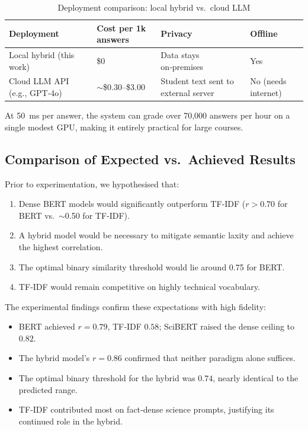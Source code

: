 \documentclass[11pt,a4paper]{article}
\begin{document}
\begin{table}[H]
\centering
\caption{Deployment comparison: local hybrid vs.~cloud LLM}
\label{tab:deployment}
\begin{tabular}{p{} p{} p{} p{}}
\toprule
\textbf{Deployment} & \textbf{Cost per 1k answers} & \textbf{Privacy} & \textbf{Offline} \\
\midrule
Local hybrid (this work) & \$0 & Data stays on‑premises & Yes \\
Cloud LLM API (e.g., GPT‑4o) & $\sim$\$0.30--\$3.00 & Student text sent to external server & No (needs internet) \\
\bottomrule
\end{tabular}
\end{table}

At 50~ms per answer, the system can grade over 70,000 answers per hour on a single modest GPU, making it entirely practical for large courses.

\subsection{Comparison of Expected vs.~Achieved Results}
\label{sec:comparison}
Prior to experimentation, we hypothesised that:
\begin{enumerate}[noitemsep]
\item Dense BERT models would significantly outperform TF‑IDF ($r > 0.70$ for BERT vs.~$\sim$0.50 for TF‑IDF).
\item A hybrid model would be necessary to mitigate semantic laxity and achieve the highest correlation.
\item The optimal binary similarity threshold would lie around 0.75 for BERT.
\item TF‑IDF would remain competitive on highly technical vocabulary.
\end{enumerate}

The experimental findings confirm these expectations with high fidelity:
\begin{itemize}[noitemsep]
\item BERT achieved $r = 0.79$, TF‑IDF $0.58$; SciBERT raised the dense ceiling to $0.82$.
\item The hybrid model's $r = 0.86$ confirmed that neither paradigm alone suffices.
\item The optimal binary threshold for the hybrid was $0.74$, nearly identical to the predicted range.
\item TF‑IDF contributed most on fact‑dense science prompts, justifying its continued role in the hybrid.
\end{itemize}
\end{document}
